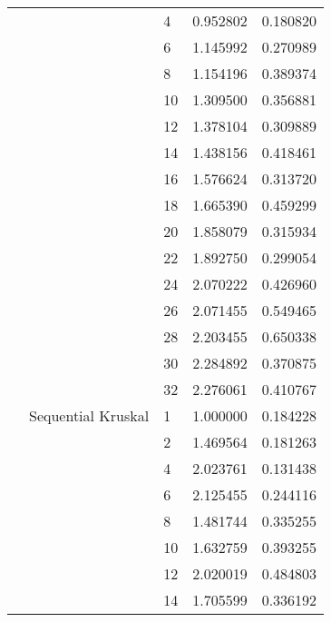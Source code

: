 \begin{tabular}{lllrr}
                      &                     & 4  &  0.952802 &  0.180820 \\
                      &                     & 6  &  1.145992 &  0.270989 \\
                      &                     & 8  &  1.154196 &  0.389374 \\
                      &                     & 10 &  1.309500 &  0.356881 \\
                      &                     & 12 &  1.378104 &  0.309889 \\
                      &                     & 14 &  1.438156 &  0.418461 \\
                      &                     & 16 &  1.576624 &  0.313720 \\
                      &                     & 18 &  1.665390 &  0.459299 \\
                      &                     & 20 &  1.858079 &  0.315934 \\
                      &                     & 22 &  1.892750 &  0.299054 \\
                      &                     & 24 &  2.070222 &  0.426960 \\
                      &                     & 26 &  2.071455 &  0.549465 \\
                      &                     & 28 &  2.203455 &  0.650338 \\
                      &                     & 30 &  2.284892 &  0.370875 \\
                      &                     & 32 &  2.276061 &  0.410767 \\
                      & Sequential Kruskal & 1  &  1.000000 &  0.184228 \\
                      &                     & 2  &  1.469564 &  0.181263 \\
                      &                     & 4  &  2.023761 &  0.131438 \\
                      &                     & 6  &  2.125455 &  0.244116 \\
                      &                     & 8  &  1.481744 &  0.335255 \\
                      &                     & 10 &  1.632759 &  0.393255 \\
                      &                     & 12 &  2.020019 &  0.484803 \\
                      &                     & 14 &  1.705599 &  0.336192 \\

\end{tabular}
